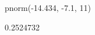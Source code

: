\begin{Schunk}
\begin{Sinput}
  pnorm(-14.434, -7.1, 11)
\end{Sinput}
\begin{Soutput}
[1] 0.2524732
\end{Soutput}
\end{Schunk}
